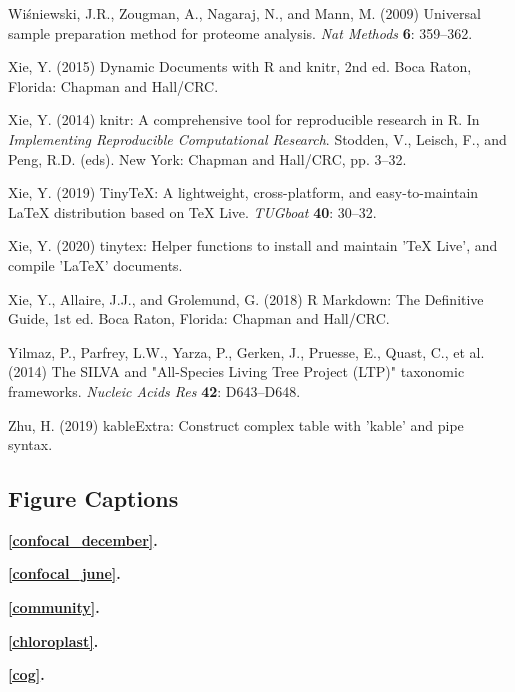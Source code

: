 \documentclass[
  12pt,
]{article}
\begin{document}
\leavevmode\hypertarget{ref-Wisniewski2009}{}%
Wiśniewski, J.R., Zougman, A., Nagaraj, N., and Mann, M. (2009)
Universal sample preparation method for proteome analysis. \emph{Nat
Methods} \textbf{6}: 359--362.

\leavevmode\hypertarget{ref-Xie2015}{}%
Xie, Y. (2015) Dynamic Documents with R and knitr, 2nd ed. Boca Raton,
Florida: Chapman and Hall/CRC.

\leavevmode\hypertarget{ref-Xie2014}{}%
Xie, Y. (2014) knitr: A comprehensive tool for reproducible research in
R. In \emph{Implementing Reproducible Computational Research}. Stodden,
V., Leisch, F., and Peng, R.D. (eds). New York: Chapman and Hall/CRC,
pp. 3--32.

\leavevmode\hypertarget{ref-Xie2019a}{}%
Xie, Y. (2019) TinyTeX: A lightweight, cross-platform, and
easy-to-maintain LaTeX distribution based on TeX Live. \emph{TUGboat}
\textbf{40}: 30--32.

\leavevmode\hypertarget{ref-Xie2020}{}%
Xie, Y. (2020) tinytex: Helper functions to install and maintain 'TeX
Live', and compile 'LaTeX' documents.

\leavevmode\hypertarget{ref-Xie2018}{}%
Xie, Y., Allaire, J.J., and Grolemund, G. (2018) R Markdown: The
Definitive Guide, 1st ed. Boca Raton, Florida: Chapman and Hall/CRC.

\leavevmode\hypertarget{ref-Yilmaz2014}{}%
Yilmaz, P., Parfrey, L.W., Yarza, P., Gerken, J., Pruesse, E., Quast,
C., et al. (2014) The SILVA and "All-Species Living Tree Project (LTP)"
taxonomic frameworks. \emph{Nucleic Acids Res} \textbf{42}: D643--D648.

\leavevmode\hypertarget{ref-Zhu2019}{}%
Zhu, H. (2019) kableExtra: Construct complex table with 'kable' and pipe
syntax.

\newpage 
\setlength\parindent{0pt}

\hypertarget{figure-captions}{%
\subsection{Figure Captions}\label{figure-captions}}

\textbf{\autoref{confocal_december}.} 

\textbf{\autoref{confocal_june}.} 

\textbf{\autoref{community}.} 

\textbf{\autoref{chloroplast}.} 

\textbf{\autoref{cog}.} 
\end{document}
